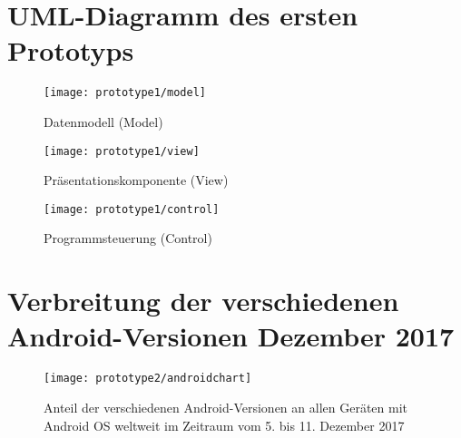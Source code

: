 \chapter{UML-Diagramm des ersten Prototyps}\label{chap:uml}
\begin{figure}[h]
  \centering
  \texttt{[image: prototype1/model]}
  \caption{Datenmodell (Model)}
  \label{fig:model}
\end{figure}

\begin{figure}[h]
  \centering
  \texttt{[image: prototype1/view]}
  \caption{Präsentationskomponente (View)}
  \label{fig:view}
\end{figure}

\begin{figure}[h]
  \centering
  \texttt{[image: prototype1/control]}
  \caption{Programmsteuerung (Control)}
  \label{fig:control}
\end{figure}

\chapter{Verbreitung der verschiedenen Android-Versionen Dezember 2017}
\begin{figure}[h]
  \centering
  \texttt{[image: prototype2/androidchart]}
  \caption{Anteil der verschiedenen Android-Versionen an allen Geräten mit Android OS weltweit im Zeitraum vom 5. bis 11. Dezember 2017}
  \label{fig:versionchart}
\end{figure}
